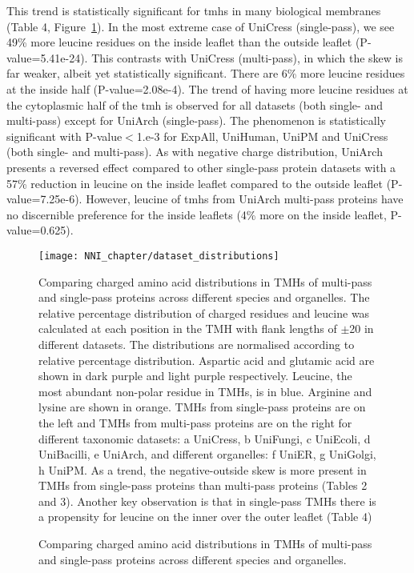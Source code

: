 This trend is statistically significant for \gls{tmh}s in many biological membranes (Table 4, Figure~\ref{fig:dataset_distributions}). In the most extreme case of UniCress (single-pass), we see 49\% more leucine residues on the inside leaflet than the outside leaflet (P-value=5.41e-24). This contrasts with UniCress (multi-pass), in which the skew is far weaker, albeit yet statistically significant. There are 6\% more leucine residues at the inside half (P-value=2.08e-4). The trend of having more leucine residues at the cytoplasmic half of the \gls{tmh} is observed for all datasets (both single- and multi-pass) except for UniArch (single-pass). The phenomenon is statistically significant with P-value$<$1.e-3 for ExpAll, UniHuman, UniPM and UniCress (both single- and multi-pass). As with negative charge distribution, UniArch presents a reversed effect compared to other single-pass protein datasets with a 57\% reduction in leucine on the inside leaflet compared to the outside leaflet (P-value=7.25e-6). However, leucine of \gls{tmh}s from UniArch multi-pass proteins have no discernible preference for the inside leaflets (4\% more on the inside leaflet, P-value=0.625).

\begin{figure}[!ht]
\centering
\texttt{[image: NNI\_chapter/dataset\_distributions]}
\caption{Comparing charged amino acid distributions in TMHs of multi-pass and single-pass proteins across different species and organelles.}
\medskip
\justify
\small
Comparing charged amino acid distributions in TMHs of multi-pass and single-pass proteins across different species and organelles. The relative percentage distribution of charged residues and leucine was calculated at each position in the TMH with flank lengths of $\pm$20 in different datasets. The distributions are normalised according to relative percentage distribution. Aspartic acid and glutamic acid are shown in dark purple and light purple respectively. Leucine, the most abundant non-polar residue in TMHs, is in blue. Arginine and lysine are shown in orange. TMHs from single-pass proteins are on the left and TMHs from multi-pass proteins are on the right for different taxonomic datasets: a UniCress, b UniFungi, c UniEcoli, d UniBacilli, e UniArch, and different organelles: f UniER, g UniGolgi, h UniPM. As a trend, the negative-outside skew is more present in TMHs from single-pass proteins than multi-pass proteins (Tables 2 and 3). Another key observation is that in single-pass TMHs there is a propensity for leucine on the inner over the outer leaflet (Table 4)
\label{fig:dataset_distributions}
\end{figure}

